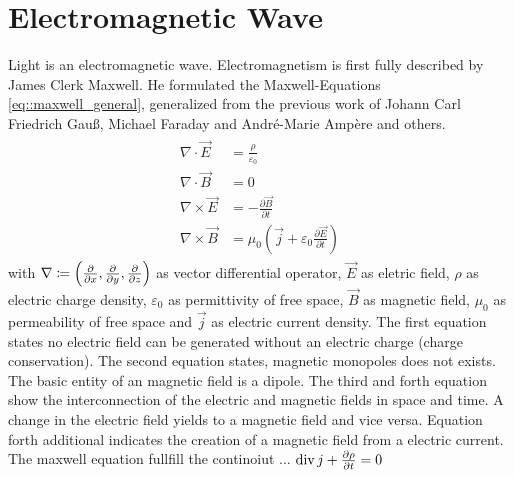 \section{Electromagnetic Wave}
% 
Light is an electromagnetic wave. Electromagnetism is first fully described by James Clerk Maxwell. He formulated the Maxwell-Equations \cref{eq::maxwell_general}, generalized from the previous work of Johann Carl Friedrich Gau{\ss}, Michael Faraday and Andr\'{e}-Marie Amp\`{e}re and others. 
% 
% 
\begin{align} 
\begin{split} \label{eq::maxwell_general}
    \nabla \cdot \vec{E} &= \frac {\rho} {\varepsilon_0}\\
    \nabla \cdot \vec{B} &= 0\\
    \nabla \times \vec{E} &= -\frac{\partial \vec{B}} {\partial t}\\
    \nabla \times \vec{B} &= \mu_0\left(\vec{j} + \varepsilon_0 \frac{\partial \vec{E}} {\partial t} \right)
\end{split}
\end{align}
% 
with $\nabla \coloneqq \left({\partial \over \partial x}, {\partial \over \partial y}, {\partial \over \partial z} \right)$ as vector differential operator, $\vec{E}$ as eletric field, $\rho$ as electric charge density, $\varepsilon_0$ as permittivity of free space, $\vec{B}$ as magnetic field, $\mu_0$ as permeability of free space and $\vec{j}$ as electric current density. 
% 
The first equation states no electric field can be generated without an electric charge (charge conservation).
The second equation states, magnetic monopoles does not exists. The basic entity of an magnetic field is a dipole.
The third and forth equation show the interconnection of the electric and magnetic fields in space and time. A change in the electric field yields to a magnetic field and vice versa. Equation forth additional indicates the creation of a magnetic field from a electric current. The maxwell equation fullfill the continoiut ... $\operatorname{div} j + \frac{\partial \rho}{\partial t} = 0$
